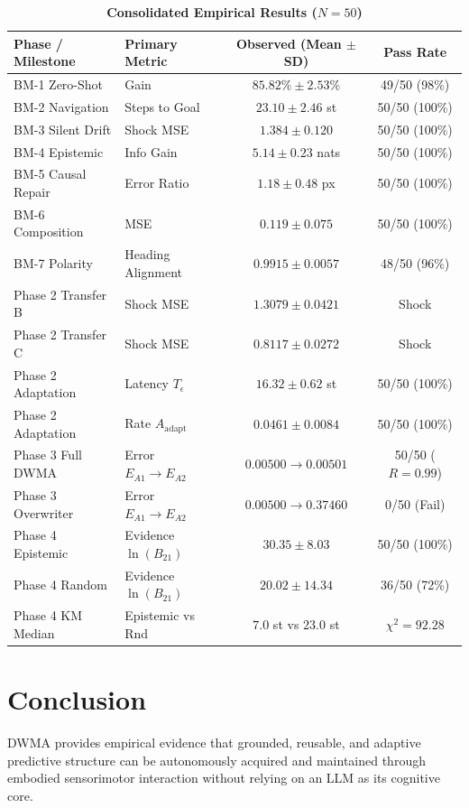 \documentclass[10pt,twocolumn,a4paper]{article}
\begin{document}
\begin{table}[h]
\centering
\scriptsize
\caption{\textbf{Consolidated Empirical Results ($N=50$)}}
\label{tab:master}
\begin{tabular}{llcc}
\toprule
\textbf{Phase / Milestone} & \textbf{Primary Metric} & \textbf{Observed (Mean $\pm$ SD)} & \textbf{Pass Rate} \\
\midrule
BM-1 Zero-Shot & Gain & $85.82\% \pm 2.53\%$ & 49/50 (98\%) \\
BM-2 Navigation & Steps to Goal & $23.10 \pm 2.46$ st & 50/50 (100\%) \\
BM-3 Silent Drift & Shock MSE & $1.384 \pm 0.120$ & 50/50 (100\%) \\
BM-4 Epistemic & Info Gain & $5.14 \pm 0.23$ nats & 50/50 (100\%) \\
BM-5 Causal Repair & Error Ratio & $1.18 \pm 0.48$ px & 50/50 (100\%) \\
BM-6 Composition & MSE & $0.119 \pm 0.075$ & 50/50 (100\%) \\
BM-7 Polarity & Heading Alignment & $0.9915 \pm 0.0057$ & 48/50 (96\%) \\
\midrule
Phase 2 Transfer B & Shock MSE & $1.3079 \pm 0.0421$ & Shock \\
Phase 2 Transfer C & Shock MSE & $0.8117 \pm 0.0272$ & Shock \\
Phase 2 Adaptation & Latency $T_\epsilon$ & $16.32 \pm 0.62$ st & 50/50 (100\%) \\
Phase 2 Adaptation & Rate $A_{\text{adapt}}$ & $0.0461 \pm 0.0084$ & 50/50 (100\%) \\
\midrule
Phase 3 Full DWMA & Error $E_{A1} \to E_{A2}$ & $0.00500 \to 0.00501$ & 50/50 ($R=0.99$) \\
Phase 3 Overwriter & Error $E_{A1} \to E_{A2}$ & $0.00500 \to 0.37460$ & 0/50 (Fail) \\
\midrule
Phase 4 Epistemic & Evidence $\ln(B_{21})$ & $30.35 \pm 8.03$ & 50/50 (100\%) \\
Phase 4 Random & Evidence $\ln(B_{21})$ & $20.02 \pm 14.34$ & 36/50 (72\%) \\
Phase 4 KM Median & Epistemic vs Rnd & $7.0$ st vs $23.0$ st & $\chi^2 = 92.28$ \\
\bottomrule
\end{tabular}
\end{table}

\section{Conclusion}
DWMA provides empirical evidence that grounded, reusable, and adaptive predictive structure can be autonomously acquired and maintained through embodied sensorimotor interaction without relying on an LLM as its cognitive core.
\end{document}

